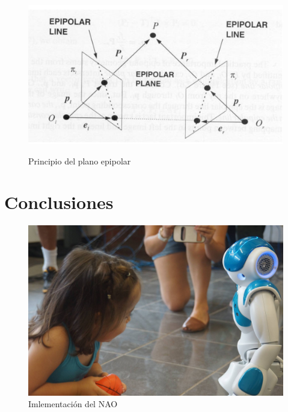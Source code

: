 \documentclass[11pt,letterpaper]{article}     %
\begin{document}
\begin{figure}[hbtp]
\caption{Principio del plano epipolar}
\centering
\includegraphics[scale=0.21]{imagenes/planoEpipolar.png}
\label{fig:epipolar}
\end{figure}


\section{Conclusiones}
\begin{figure}[hbtp]
\caption{Imlementaci\' on del NAO}
\centering
\includegraphics[scale=0.15]{imagenes/10553806_792493910785449_7200970304906961642_o.jpg}
\end{figure}




\newpage
\renewcommand{\bibname}{Referencias}
\end{document}
